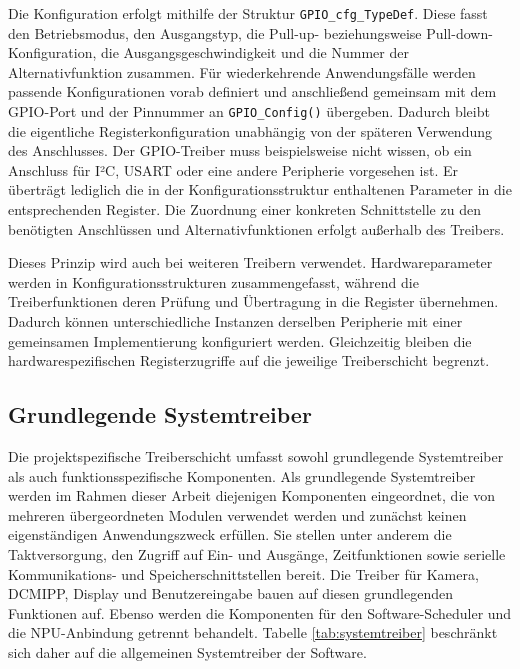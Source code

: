 Die Konfiguration erfolgt mithilfe der Struktur \texttt{GPIO\_cfg\_TypeDef}. Diese fasst den Betriebsmodus, den Ausgangstyp, die Pull-up- beziehungsweise Pull-down-Konfiguration, die Ausgangsgeschwindigkeit und die Nummer der Alternativfunktion zusammen. Für wiederkehrende Anwendungsfälle werden passende Konfigurationen vorab definiert und anschließend gemeinsam mit dem GPIO-Port und der Pinnummer an \texttt{GPIO\_Config()} übergeben. Dadurch bleibt die eigentliche Registerkonfiguration unabhängig von der späteren Verwendung des Anschlusses. Der GPIO-Treiber muss beispielsweise nicht wissen, ob ein Anschluss für I²C, USART oder eine andere Peripherie vorgesehen ist. Er überträgt lediglich die in der Konfigurationsstruktur enthaltenen Parameter in die entsprechenden Register. Die Zuordnung einer konkreten Schnittstelle zu den benötigten Anschlüssen und Alternativfunktionen erfolgt außerhalb des Treibers.

Dieses Prinzip wird auch bei weiteren Treibern verwendet. Hardwareparameter werden in Konfigurationsstrukturen zusammengefasst, während die Treiberfunktionen deren Prüfung \linebreak und Übertragung in die Register übernehmen. Dadurch können unterschiedliche Instanzen derselben Peripherie mit einer gemeinsamen Implementierung konfiguriert werden. Gleichzeitig bleiben die hardwarespezifischen Registerzugriffe auf die jeweilige Treiberschicht begrenzt.

\subsection{Grundlegende Systemtreiber}\label{sub:systemtreiber}

Die projektspezifische Treiberschicht umfasst sowohl grundlegende Systemtreiber als auch funktionsspezifische Komponenten. Als grundlegende Systemtreiber werden im Rahmen dieser Arbeit diejenigen Komponenten eingeordnet, die von mehreren übergeordneten Modulen verwendet werden und zunächst keinen eigenständigen Anwendungszweck erfüllen. Sie stellen unter anderem die Taktversorgung, den Zugriff auf Ein- und Ausgänge, Zeitfunktionen sowie serielle Kommunikations- und Speicherschnittstellen bereit. Die Treiber für Kamera, DCMIPP, Display und Benutzereingabe bauen auf diesen grundlegenden Funktionen auf. Ebenso werden die Komponenten für den Software-Scheduler und die NPU-Anbindung getrennt behandelt. Tabelle \ref{tab:systemtreiber} beschränkt sich daher auf die allgemeinen Systemtreiber der Software.

